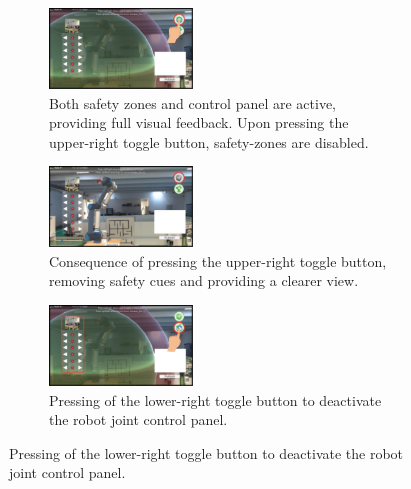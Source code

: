 \begin{figure}[h]
    \centering
    \begin{subfigure}{\textwidth}
        \centering
        \includegraphics[width=0.42\textwidth]{figs/feature-1.png}
        \caption{Both safety zones and control panel are active, providing full visual feedback. Upon pressing the upper-right toggle button, safety-zones are disabled.}
        \label{fig:subfig1}
    \end{subfigure}

    \vspace{0.5em} %

    \begin{subfigure}{\textwidth}
        \centering
        \includegraphics[width=0.42\textwidth]{figs/feature-2.png}
        \caption{Consequence of pressing the upper-right toggle button, removing safety cues and providing a clearer view.}
        \label{fig:subfig2}
    \end{subfigure}

    \vspace{0.5em}

    \begin{subfigure}{\textwidth}
        \centering
        \includegraphics[width=0.42\textwidth]{figs/feature-3.png}
        \caption{Pressing of the lower-right toggle button to deactivate the robot joint control panel.}
        \label{fig:subfig3}
    \end{subfigure}


\end{figure}
